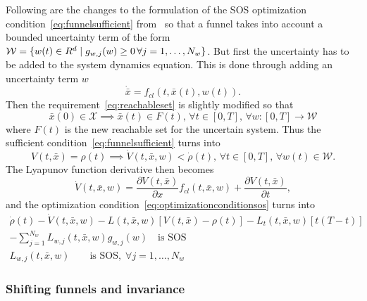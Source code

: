 Following are the changes to the formulation of the \ac{SOS} optimization
condition~\eqref{eq:funnelsufficient}
from~\cite{majumdarFunnelLibrariesRealtime2017} so that a funnel takes into
account a bounded uncertainty term of the form \(\mathcal{W} = \lbrace w(t) \in
  R^d \mid g_{w,j}(w) \geq 0\, \forall j = 1,\ldots,N_w\rbrace\). But first the
uncertainty has to be added to the system dynamics equation. This is done
through adding an uncertainty term \(w\)
\begin{equation}
  \dot{\bar{x}} = f_{cl}(t, \bar{x}(t), w(t)).
\end{equation}
Then the requirement~\eqref{eq:reachableset} is slightly modified so that
\begin{equation}
  \label{eq:uncertain-reachableset}
  \bar{x}(0) \in \mathcal{X} \implies \bar{x}(t) \in F(t),\, \forall t \in
  [0,T], \, \forall w \colon [0,T] \rightarrow \mathcal{W}
\end{equation} 
where \(F(t)\) is the new reachable set for the uncertain system. Thus the
sufficient condition~\eqref{eq:funnelsufficient} turns into
\begin{equation}
  \label{eq:funneluncertain-sufficient}
  V(t,\bar{x}) = \rho(t) \implies \dot{V}(t,\bar{x},w) < \dot{\rho}(t), \, \forall t \in [0,T], \, \forall w(t) \in \mathcal{W}.
\end{equation}
The Lyapunov function derivative then becomes
\begin{equation}
  \dot{V}(t,\bar{x}, w) = \frac{\partial V(t,\bar{x})}{\partial x} f_{cl}(t,\bar{x},w) + \frac{\partial V(t,\bar{x})}{\partial t},
\end{equation}
and the optimization condition~\eqref{eq:optimizationconditionsos} turns into
\begin{align}
  \label{eq:optimizationconditionuncertain}
  \dot{\rho}(t) - \dot{V}(t,\bar{x},w) - L(t,\bar{x},w) \left[ V(t,\bar{x}) - \rho(t) \right] - L_{t}(t,\bar{x},w)\left[ t\left( T - t \right) \right]  & \nonumber \\
  - \sum_{j=1}^{N_{w}} L_{w,j}(t,\bar{x},w)g_{w,j}(w) \quad \text{is SOS} &  \\
  L_{w,j}(t,\bar{x},w) \qquad \text{is SOS}, \; \forall j = 1,\ldots,N_w \nonumber
\end{align}

\subsubsection{Shifting funnels and invariance}

